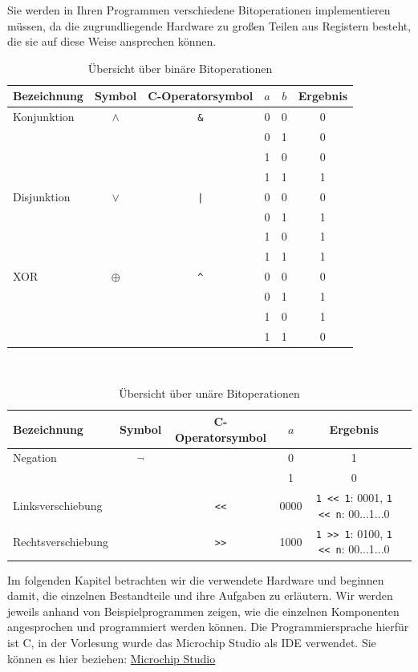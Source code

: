 \documentclass[11pt,a4paper]{scrartcl}
\begin{document}
Sie werden in Ihren Programmen verschiedene Bitoperationen implementieren müssen, da die zugrundliegende Hardware zu großen Teilen aus Registern besteht, die sie auf diese Weise ansprechen können.
\begin{table}[h]
\centering
\begin{tabular}{|l|c|c|c|c|c|}
\hline
Bezeichnung & Symbol & C-Operatorsymbol & $a$ & $b$ & Ergebnis \\
\hline
Konjunktion & $\land$ & \texttt{\&} & 0 & 0 & 0 \\
&&&0 & 1 & 0 \\
&&&1 & 0 & 0 \\
&&&1 & 1 & 1 \\
\hline
Disjunktion & $\lor$ & \texttt{|} & 0 & 0 & 0 \\
&&&0 & 1 & 1 \\
&&&1 & 0 & 1 \\
&&&1 & 1 & 1 \\
\hline
XOR & $\oplus$ & \texttt{\^} & 0 & 0 & 0 \\
&&&0 & 1 & 1 \\
&&&1 & 0 & 1 \\
&&&1 & 1 & 0 \\
\hline
\end{tabular}
\caption{Übersicht über binäre Bitoperationen}
\end{table} \\

\begin{table}[h]
\centering
\begin{tabular}{|l|c|c|c|c|c|}
\hline
Bezeichnung & Symbol & C-Operatorsymbol & $a$ & Ergebnis \\
\hline
Negation & $\lnot$ & \texttt{~} & 0 & 1 \\
&&&1 & 0 \\
\hline
Linksverschiebung & &\texttt{<<} & 0000 & \texttt{1 << 1}: 0001, \texttt{1 << n}: 00...1...0 \\
\hline
Rechtsverschiebung & & \texttt{>>} & 1000 & \texttt{1 >> 1}: 0100, \texttt{1 << n}: 00...1...0 \\
\hline
\end{tabular}
\caption{Übersicht über unäre Bitoperationen}
\end{table}

Im folgenden Kapitel betrachten wir die verwendete Hardware und beginnen damit, die einzelnen Bestandteile und ihre Aufgaben zu erläutern. Wir werden jeweils anhand von Beispielprogrammen zeigen, wie die einzelnen Komponenten angesprochen und programmiert werden können. Die Programmiersprache hierfür ist C, in der Vorlesung wurde das {\glqq}Microchip Studio{\grqq} als IDE verwendet. Sie können es hier beziehen: 
\href{https://www.microchip.com/en-us/development-tools-tools-and-software/microchip-studio-for-avr-and-sam-devices}{Microchip Studio}
\end{document}
